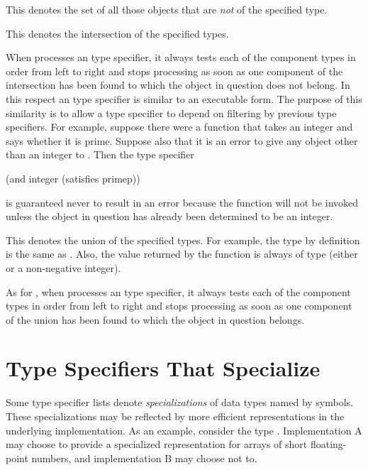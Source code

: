 \begin{flushdesc}
\item[\cd{(not \emph{type})}]
This denotes the set of all those objects that
are \emph{not} of the specified type.

\item[\cd{(and \emph{type1} \emph{type2} ...)}]
This denotes the intersection of
the specified types.

When  processes an  type specifier, it always
tests each of the component types in order from left to right
and stops processing as soon as one component of the intersection has
been found to which the object in question does not belong.
In this respect an  type specifier is similar to an
executable  form.  The purpose of this similarity is to allow
a  type specifier to depend on filtering by previous
type specifiers.  For example, suppose there were a function 
that takes an integer and says whether it is prime.  Suppose also that
it is an error to give any object other than an integer to .
Then the type specifier
\begin{lisp}
(and integer (satisfies primep))
\end{lisp}
is guaranteed never to result in an error because the function 
will not be invoked unless the object in question has already been
determined to be an integer.

\item[\cd{(or \emph{type1} \emph{type2} ...)}]
This denotes the union of the
specified types.  For example, the type  by definition is the same as
.  Also, the value returned by the function
 is always of type 
(either {\nil} or a non-negative integer).

As for ,
when  processes an  type specifier, it always
tests each of the component types in order from left to right
and stops processing as soon as one component of the union has
been found to which the object in question belongs.
\end{flushdesc}

\section{Type Specifiers That Specialize}
\label{SPECIALIZED-TYPE-SPECIFIER-SECTION}

Some type specifier lists denote \emph{specializations} of
data types named by symbols.  These specializations may be
reflected by more efficient representations in the underlying
implementation.  As an example, consider the type .
Implementation A may choose to provide a specialized representation
for arrays of short floating-point numbers, and implementation B
may choose not to.

